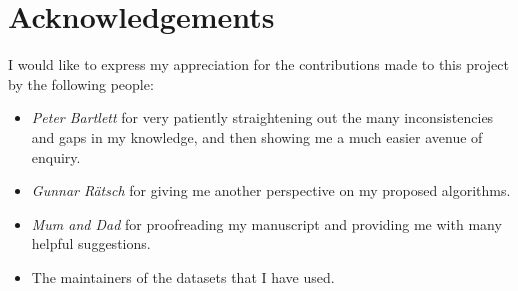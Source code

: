 
\chapter{Acknowledgements}

I would like to express my appreciation for the contributions made to
this project by the following people:

\begin{itemize}
\item	\emph{Peter Bartlett} for very patiently straightening out the
	many inconsistencies and gaps in my knowledge, and then
	showing me a much easier avenue of enquiry.

\item	\emph{Gunnar R\"{a}tsch} for giving me another perspective on
	my proposed algorithms.

\item	\emph{Mum and Dad} for proofreading my manuscript and
	providing me with many helpful suggestions.

\item	The maintainers of the datasets that I have used.
\end{itemize}


